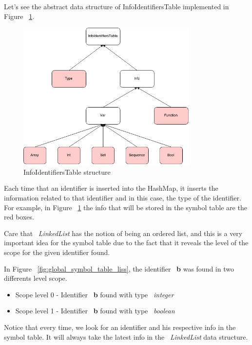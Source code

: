\documentclass[
  oneside,
  11pt, a4paper,
  footinclude=true,
  headinclude=true,
  cleardoublepage=empty
]{scrbook}
\begin{document}
Let's see the abstract data structure of InfoIdentifiersTable implemented in Figure ~\ref{fig:infoidentifierstable_structure}.

\begin{figure}[h!]
  \centering
    \includegraphics[width=0.8\textwidth]{img/InfoIdentifiersTable.png}
    \caption{InfoIdentifiersTable structure}
    \label{fig:infoidentifierstable_structure}
\end{figure}

Each time that an identifier is inserted into the HashMap, it inserts the information related to that identifier and in this case, the type of the identifier.
For example, in Figure ~\ref{fig:infoidentifierstable_structure} the info that will be stored in the symbol table are the red boxes.

Care that ~\textit{LinkedList} has the notion of being an ordered list, and this is a very important idea for the symbol table due to the fact that it reveals the level of the scope for the given identifier found.

In Figure ~\ref{fig:global_symbol_table_liss}, the identifier ~\textbf{b} was found in two differents level scope.
\begin{itemize}
\item Scope level 0 - Identifier ~\textbf{b} found with type ~\textit{integer}
\item Scope level 1 - Identifier ~\textbf{b} found with type ~\textit{boolean}
\end{itemize}

Notice that every time, we look for an identifier and his respective info in the symbol table. It will always take the latest info in the ~\textit{LinkedList} data structure. 
\end{document}

